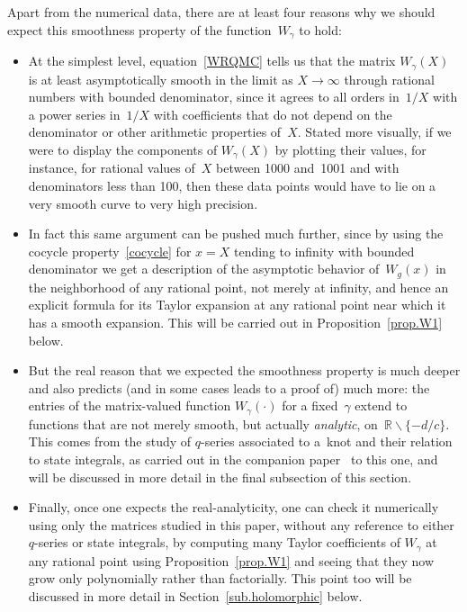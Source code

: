 \documentclass[pdftex]{sigma}
\numberwithin{equation}{section}
\def\R{\mathbb R}
\def\ssm{\smallsetminus}
\def\g{\gamma}
\begin{document}
Apart from the numerical data, there are at least four reasons why we
should expect this smoothness property of the function~$W_\g$ to hold:
\begin{itemize}\itemsep=0pt
\item[{\bf 1.}] At the simplest level, equation~\eqref{WRQMC} tells us that the matrix
$W_\g(X)$ is at least asymptotically smooth in the limit as $X\to\infty$ through rational
numbers with bounded denominator, since it agrees to all orders in~$1/X$ with a
power series in~$1/X$ with coefficients that do not depend on the denominator or
other arithmetic properties of~$X$. Stated more visually, if we were to display
the components of $W_\g(X)$ by plotting their values, for instance, for
rational values of~$X$ between 1000 and~1001 and with denominators less than 100,
then these data points would have to lie on a very smooth curve to very high precision.
\item[{\bf 2.}] In fact this same argument can be pushed much further, since by using
the cocycle property~\eqref{cocycle} for $x=X$ tending to infinity with bounded
denominator we get a description of the asymptotic behavior of~$W_g(x)$ in the
neighborhood of any rational point, not merely at infinity, and hence an explicit
formula for its Taylor expansion at any rational point near which it has a smooth
expansion. This will be carried out in Proposition~\ref{prop.W1} below.
\item[{\bf 3.}] But the real reason that we expected the smoothness property is
much deeper and also predicts (and in some cases leads to a proof of) much more: the
entries of the matrix-valued function $W_\g(\cdot)$ for a fixed~$\g$ extend to functions
that are not merely smooth, but actually \emph{analytic}, on~$\R\ssm\{-d/c\}$. This
comes from the study of $q$-series associated to a~knot and their relation to state
integrals, as carried out in the companion paper~\cite{GZ:qseries} to this one,
and will be discussed in more detail in the final subsection of this section.
\item[{\bf 4.}] Finally, once one expects the real-analyticity, one can check it numerically
using only the matrices studied in this paper, without any reference to either $q$-series
or state integrals, by computing many Taylor coefficients of $W_\g$ at any rational point
using Proposition~\ref{prop.W1} and seeing that they now grow only polynomially rather
than factorially. This point too will be discussed in more detail
in Section~\ref{sub.holomorphic} below.
\end{itemize}
\end{document}
